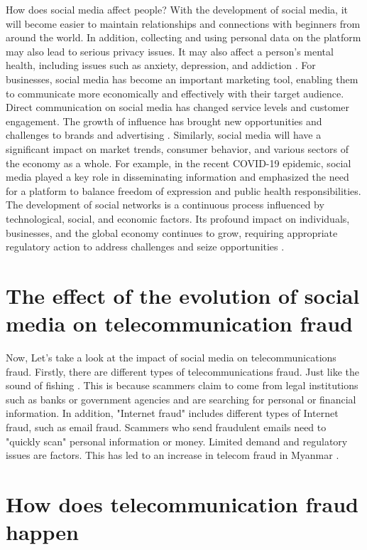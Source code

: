 \documentclass[man,floatsintext]{apa7}
\begin{document}
How does social media affect people? With the development of social media, it will become easier to maintain relationships and connections with beginners from around the world. In addition, collecting and using personal data on the platform may also lead to serious privacy issues. It may also affect a person's mental health, including issues such as anxiety, depression, and addiction \autocite{simplerUnjustWebWe2012}. For businesses, social media has become an important marketing tool, enabling them to communicate more economically and effectively with their target audience. Direct communication on social media has changed service levels and customer engagement. The growth of influence has brought new opportunities and challenges to brands and advertising \autocite{deansEvolutionSocialMedia2018}. Similarly, social media will have a significant impact on market trends, consumer behavior, and various sectors of the economy as a whole. For example, in the recent COVID-19 epidemic, social media played a key role in disseminating information and emphasized the need for a platform to balance freedom of expression and public health responsibilities. The development of social networks is a continuous process influenced by technological, social, and economic factors. Its profound impact on individuals, businesses, and the global economy continues to grow, requiring appropriate regulatory action to address challenges and seize opportunities \autocite{kaneEvolutionaryImplicationsSocial2017}.

\section{The effect of the evolution of social media on telecommunication fraud}

Now, Let's take a look at the impact of social media on telecommunications fraud. Firstly, there are different types of telecommunications fraud. Just like the sound of fishing \autocite{zhangSocialMediaSecurity2016}. This is because scammers claim to come from legal institutions such as banks or government agencies and are searching for personal or financial information. In addition, "Internet fraud" includes different types of Internet fraud, such as email fraud. Scammers who send fraudulent emails need to "quickly scan" personal information or money. Limited demand and regulatory issues are factors. This has led to an increase in telecom fraud in Myanmar \autocite{canNewDirectionSocial2019}.

\section{How does telecommunication fraud happen}
\end{document}
